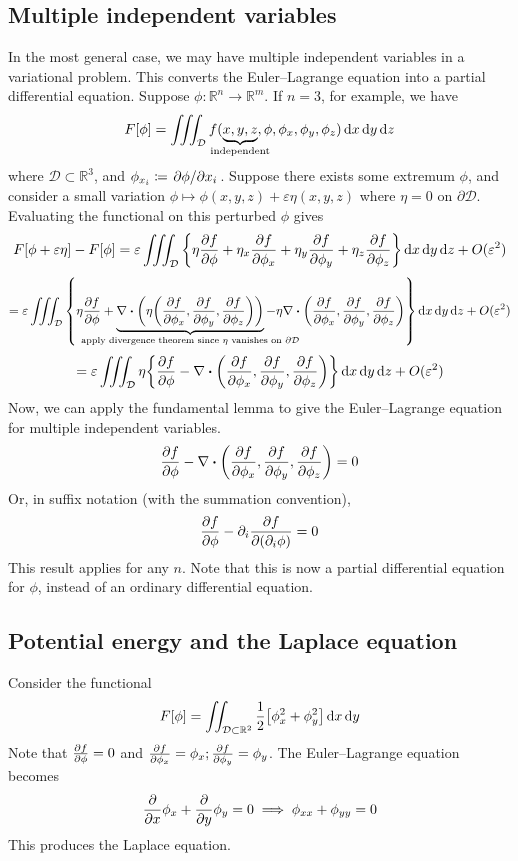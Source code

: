 \subsection{Multiple independent variables}
In the most general case, we may have multiple independent variables in a variational problem.
This converts the Euler--Lagrange equation into a partial differential equation.
Suppose \( \phi \colon \mathbb R^n \to \mathbb R^m \).
If \( n = 3 \), for example, we have
\[
	F[\phi] = \iiint_{\mathcal D} f(\underbrace{x, y, z}_{\mathclap{\text{independent}}}, \phi, \phi_x, \phi_y, \phi_z) \dd{x}\dd{y}\dd{z}
\]
where \( \mathcal D \subset \mathbb R^3 \), and \( \phi_{x_i} \coloneq \pdv*{\phi}{x_i} \).
Suppose there exists some extremum \( \phi \), and consider a small variation \( \phi \mapsto \phi(x,y,z) + \varepsilon \eta(x,y,z) \) where \( \eta = 0 \) on \( \partial \mathcal D \).
Evaluating the functional on this perturbed \( \phi \) gives
\[
	F[\phi + \varepsilon\eta] - F[\phi] = \varepsilon \iiint_{\mathcal D} \qty{ \eta \pdv{f}{\phi} + \eta_x \pdv{f}{\phi_x} + \eta_y \pdv{f}{\phi_y} + \eta_z \pdv{f}{\phi_z} } \dd{x}\dd{y}\dd{z} + O(\varepsilon^2)
\]
\[
	= \varepsilon \iiint_{\mathcal D} \qty{ \eta \pdv{f}{\phi} + \underbrace{\div(\eta\qty(\pdv{f}{\phi_x}, \pdv{f}{\phi_y}, \pdv{f}{\phi_z}))}_{\mathclap{\text{apply divergence theorem since \( \eta \) vanishes on \( \partial \mathcal D \)}}} - \eta \div(\pdv{f}{\phi_x}, \pdv{f}{\phi_y}, \pdv{f}{\phi_z}) } \dd{x}\dd{y}\dd{z} + O(\varepsilon^2)
\]
\[
	= \varepsilon \iiint_{\mathcal D} \eta \qty{ \pdv{f}{\phi} - \div(\pdv{f}{\phi_x}, \pdv{f}{\phi_y}, \pdv{f}{\phi_z}) } \dd{x}\dd{y}\dd{z} + O(\varepsilon^2)
\]
Now, we can apply the fundamental lemma to give the Euler--Lagrange equation for multiple independent variables.
\[
	\pdv{f}{\phi} - \div(\pdv{f}{\phi_x},\pdv{f}{\phi_y},\pdv{f}{\phi_z}) = 0
\]
Or, in suffix notation (with the summation convention),
\[
	\pdv{f}{\phi} - \partial_i \pdv{f}{(\partial_i \phi)} = 0
\]
This result applies for any \( n \).
Note that this is now a partial differential equation for \( \phi \), instead of an ordinary differential equation.

\subsection{Potential energy and the Laplace equation}
Consider the functional
\[
	F[\phi] = \iint_{\mathcal D \subset \mathbb R^2} \frac{1}{2} \qty[\phi_x^2 + \phi_y^2] \dd{x}\dd{y}
\]
Note that \( \pdv{f}{\phi} = 0 \) and \( \pdv{f}{\phi_x} = \phi_x; \pdv{f}{\phi_y} = \phi_y \).
The Euler--Lagrange equation becomes
\[
	\pdv{x}\phi_x + \pdv{y}\phi_y = 0 \implies \phi_{xx} + \phi_{yy} = 0
\]
This produces the Laplace equation.

